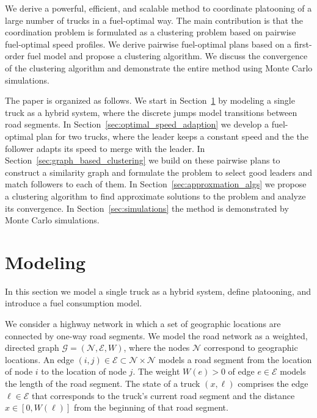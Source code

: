\documentclass[letterpaper,10pt,conference,twocolumn]{IEEEtran}
\newcommand{\set}[1]{\mathcal{#1}}
\theoremstyle{definition}
\begin{document}
We derive a powerful, efficient, and scalable method to coordinate platooning of a large number of trucks in a fuel-optimal way. The main contribution is that the coordination problem is formulated as a clustering problem based on pairwise fuel-optimal speed profiles. We derive pairwise fuel-optimal plans based on a first-order fuel model and propose a clustering algorithm. We discuss the convergence of the clustering algorithm and demonstrate the entire method using Monte Carlo simulations. 

The paper is organized as follows. We start in Section~\ref{sec:modeling} by modeling a single truck as a hybrid system, where the discrete jumps model transitions between road segments. In Section~\ref{sec:optimal_speed_adaption} we develop a fuel-optimal plan for two trucks, where the leader keeps a constant speed and the the follower adapts its speed to merge with the leader. In Section~\ref{sec:graph_based_clustering} we build on these pairwise plans to construct a similarity graph and formulate the problem to select good leaders and match followers to each of them. In Section~\ref{sec:approxmation_algs} we propose a clustering algorithm to find approximate solutions to the problem and analyze its convergence. In Section~\ref{sec:simulations} the method is demonstrated by Monte Carlo simulations.

\section{Modeling}
\label{sec:modeling}

In this section we model a single truck as a hybrid system, define platooning, and introduce a fuel consumption model.

We consider a highway network in which a set of geographic locations are connected by one-way road segments.
We model the road network as a weighted, directed graph $\set{G} = (\set{N},\set{E},W)$, where the nodes $\set{N}$ correspond to geographic locations. An edge $(i,j) \in \set{E} \subset \set{N} \times \set{N}$ models a road segment from the location of node $i$ to the location of node $j$. The weight $W(e) > 0$ of edge $e \in \set{E}$ models the length of the road segment. The state of a truck $(x,\ell)$ comprises the edge $\ell \in \set{E}$ that corresponds to the truck's current road segment and the distance $x \in [0,W(\ell)]$ from the beginning of that road segment.
\end{document}

